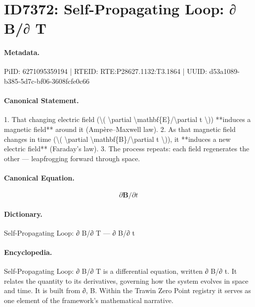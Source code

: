 \section*{ID7372: Self-Propagating Loop: ∂ B/∂ T}
\paragraph{Metadata.}
PiID: 6271095359194 | RTEID: RTE:P28627.1132:T3.1864 | UUID: d53a1089-b385-5d7c-bf06-3608fcfe0c66

\paragraph{Canonical Statement.}
1. That changing electric field (\textbackslash{}( \textbackslash{}partial \textbackslash{}mathbf\{E\}/\textbackslash{}partial t \textbackslash{})) **induces a magnetic field** around it (Ampère–Maxwell law). 2. As that magnetic field changes in time (\textbackslash{}( \textbackslash{}partial \textbackslash{}mathbf\{B\}/\textbackslash{}partial t \textbackslash{})), it **induces a new electric field** (Faraday’s law). 3. The process repeats: each field regenerates the other — leapfrogging forward through space.

\paragraph{Canonical Equation.}
\[
\partial \mathbf{B}/\partial t
\]

\paragraph{Dictionary.}
Self-Propagating Loop: ∂ B/∂ T — ∂ B/∂ t

\paragraph{Encyclopedia.}
Self-Propagating Loop: ∂ B/∂ T is a differential equation, written ∂ B/∂ t. It relates the quantity to its derivatives, governing how the system evolves in space and time. It is built from ∂, B. Within the Trawin Zero Point registry it serves as one element of the framework's mathematical narrative.
